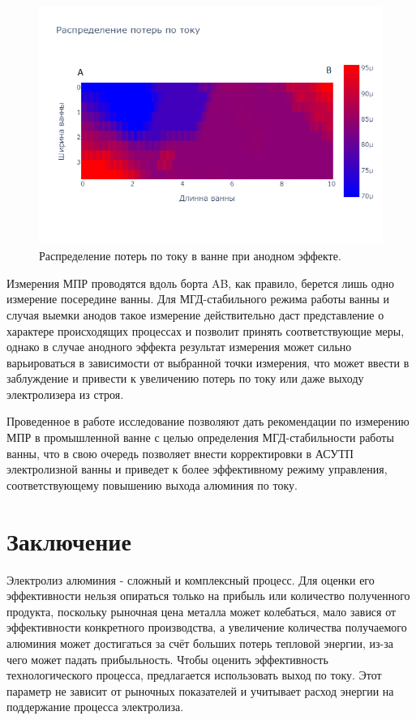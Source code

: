 \documentclass{article}
\begin{document}
\begin{figure}[H]
\centering
\includegraphics[width=0.8\linewidth]{anodloss.png}
\caption{Распределение потерь по току в ванне при анодном эффекте.\label{fig:raspAnod}}
\end{figure}

Измерения МПР проводятся вдоль борта AB, как правило, берется лишь одно измерение посередине ванны. Для МГД-стабильного режима работы ванны и случая выемки анодов такое измерение действительно даст представление о характере происходящих процессах и позволит принять соответствующие меры, однако в случае анодного эффекта результат измерения может сильно варьироваться в зависимости от выбранной точки измерения, что может ввести в заблуждение и привести к увеличению потерь по току или даже выходу электролизера из строя.

Проведенное в работе исследование позволяют дать рекомендации по измерению МПР в промышленной ванне с целью определения МГД-стабильности работы ванны, что в свою очередь позволяет внести корректировки в АСУТП электролизной ванны и приведет к более эффективному режиму управления, соответствующему повышению выхода алюминия по току.

\section*{Заключение}

Электролиз алюминия - сложный и комплексный процесс. Для оценки его эффективности нельзя опираться только на прибыль или количество полученного продукта, поскольку рыночная цена металла может колебаться, мало завися от эффективности конкретного производства, а увеличение количества получаемого алюминия может достигаться за счёт больших потерь тепловой энергии, из-за чего может падать прибыльность. Чтобы оценить эффективность технологического процесса, предлагается использовать выход по току. Этот параметр не зависит от рыночных показателей и учитывает расход энергии на поддержание процесса электролиза.
\end{document}
